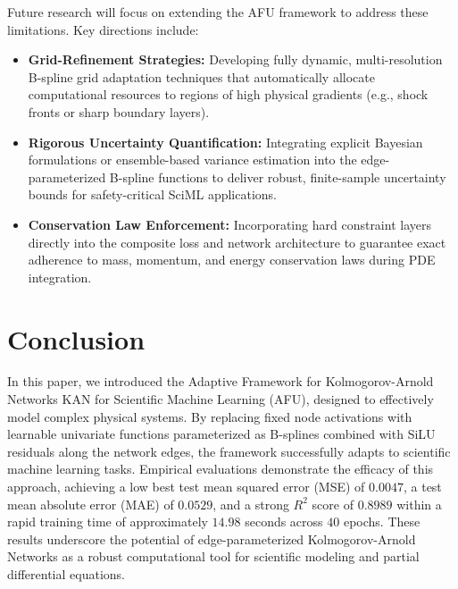 \documentclass[10pt,twocolumn]{article}
\begin{document}
Future research will focus on extending the AFU framework to address these limitations. Key directions include:
\begin{itemize}
    \item \textbf{Grid-Refinement Strategies:} Developing fully dynamic, multi-resolution B-spline grid adaptation techniques that automatically allocate computational resources to regions of high physical gradients (e.g., shock fronts or sharp boundary layers).
    \item \textbf{Rigorous Uncertainty Quantification:} Integrating explicit Bayesian formulations or ensemble-based variance estimation into the edge-parameterized B-spline functions to deliver robust, finite-sample uncertainty bounds for safety-critical SciML applications.
    \item \textbf{Conservation Law Enforcement:} Incorporating hard constraint layers directly into the composite loss and network architecture to guarantee exact adherence to mass, momentum, and energy conservation laws during PDE integration.
\end{itemize}

\section{Conclusion}
In this paper, we introduced the Adaptive Framework for Kolmogorov-Arnold Networks KAN for Scientific Machine Learning (AFU), designed to effectively model complex physical systems. By replacing fixed node activations with learnable univariate functions parameterized as B-splines combined with SiLU residuals along the network edges, the framework successfully adapts to scientific machine learning tasks. Empirical evaluations demonstrate the efficacy of this approach, achieving a low best test mean squared error (MSE) of $0.0047$, a test mean absolute error (MAE) of $0.0529$, and a strong $R^2$ score of $0.8989$ within a rapid training time of approximately $14.98$ seconds across $40$ epochs. These results underscore the potential of edge-parameterized Kolmogorov-Arnold Networks as a robust computational tool for scientific modeling and partial differential equations.



\end{document}

